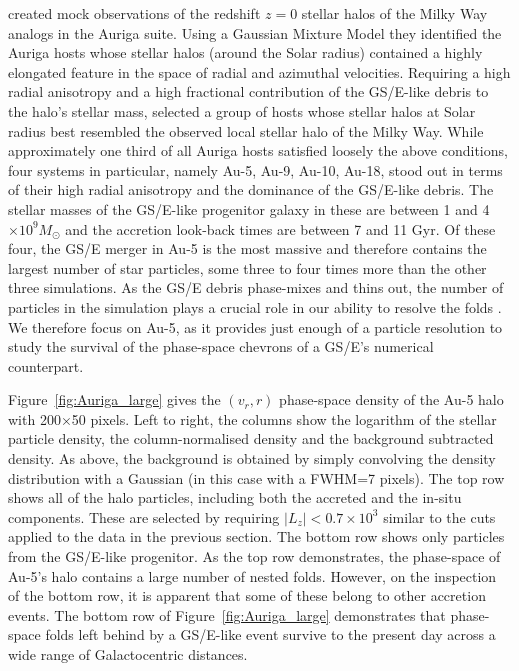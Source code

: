 \documentclass[a4paper,useAMS,usenatbib]{mnras}
\begin{document}
\citet{Fattahi2019} created mock observations of the redshift $z=0$ stellar halos of the Milky Way analogs in the Auriga suite. Using a Gaussian Mixture Model \citep[see][]{Belokurov2018} they identified the Auriga hosts whose stellar halos (around the Solar radius) contained a highly elongated feature in the space of radial and azimuthal velocities. Requiring a high radial anisotropy and a high fractional contribution of the GS/E-like debris to the halo's stellar mass, \citet{Fattahi2019} selected a group of hosts whose stellar halos at Solar radius best resembled the observed local stellar halo of the Milky Way. While approximately one third of all Auriga hosts satisfied loosely the above conditions, four systems in particular, namely Au-5, Au-9, Au-10, Au-18, stood out in terms of their high radial anisotropy and the dominance of the GS/E-like debris. The stellar masses of the GS/E-like progenitor galaxy in these are between 1 and 4$\times10^9M_{\odot}$ and the accretion look-back times are between 7 and 11 Gyr. Of these four, the GS/E merger in Au-5 is the most massive and therefore contains the largest number of star particles, some three to four times more than the other three simulations. As the GS/E debris phase-mixes and thins out, the number of particles in the simulation plays a crucial role in our ability to resolve the folds \citep[see][for a detailed discussion of the role the sampling of the phase-space density plays in detecting the amount of mixedness]{Leandro2019}. We therefore focus on Au-5, as it provides just enough of a particle resolution to study the survival of the phase-space chevrons of a GS/E's numerical counterpart.

Figure~\ref{fig:Auriga_large} gives the $(v_r,r)$ phase-space density of the Au-5 halo with 200$\times$50 pixels. Left to right, the columns show the logarithm of the stellar particle density, the column-normalised density and the background subtracted density. As above, the background is obtained by simply convolving the density distribution with a Gaussian (in this case with a FWHM=7 pixels). The top row shows all of the halo particles, including both the accreted and the in-situ components. These are selected by requiring $|L_z|<0.7\times10^3$ similar to the cuts applied to the data in the previous section. The bottom row shows only particles from the GS/E-like progenitor. As the top row demonstrates, the phase-space of Au-5's halo contains a large number of nested folds. However, on the inspection of the bottom row, it is apparent that some of these belong to other accretion events.  The bottom row of Figure~\ref{fig:Auriga_large} demonstrates that phase-space folds left behind by a GS/E-like event survive to the present day across a wide range of Galactocentric distances.
\end{document}
